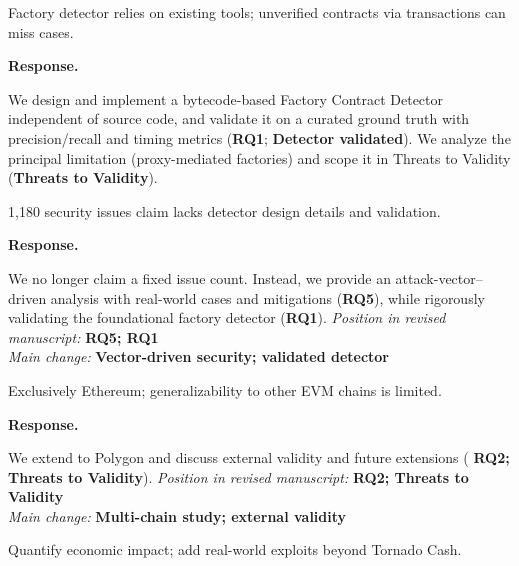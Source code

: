 \documentclass[acmsmall]{acmart}
\begin{document}
	\begin{tcolorbox}
		[commentbox,title=Reviewer \#3 -- Comment 3] Factory detector relies on existing tools;
		unverified contracts via transactions can miss cases.
	\end{tcolorbox}

	\noindent
	\textbf{Response.}

	We design and implement a bytecode-based Factory Contract Detector independent of source code, and
	validate it on a curated ground truth with precision/recall and timing metrics ({\textbf{RQ1}}; {\textbf{Detector validated}}).
	We analyze the principal limitation (proxy-mediated factories) and scope it in Threats to Validity
	({\textbf{Threats to Validity}}).

	\begin{tcolorbox}
		[commentbox,title=Reviewer \#3 -- Comment 4] 1,180 security issues claim lacks detector design
		details and validation.
	\end{tcolorbox}

	\noindent
	\textbf{Response.}

	We no longer claim a fixed issue count. Instead, we provide an attack-vector–driven analysis
	with real-world cases and mitigations ({\textbf{RQ5}}), while rigorously validating the foundational
	factory detector ({\textbf{RQ1}}). \textit{Position in revised manuscript:} {\color{red}\textbf{RQ5; RQ1}}\\
	\textit{Main change:} {\color{blue}\textbf{Vector-driven security; validated detector}}

	\begin{tcolorbox}
		[commentbox,title=Reviewer \#3 -- Comment 5] Exclusively Ethereum; generalizability to other
		EVM chains is limited.
	\end{tcolorbox}

	\noindent
	\textbf{Response.}

	We extend to Polygon and discuss external validity and future extensions ( {\textbf{RQ2; Threats to Validity}}).
	\textit{Position in revised manuscript:} {\color{red}\textbf{RQ2; Threats to Validity}}\\ \textit{Main
	change:} {\color{blue}\textbf{Multi-chain study; external validity}}

	\begin{tcolorbox}
		[commentbox,title=Reviewer \#3 -- Comment 6] Quantify economic impact; add real-world
		exploits beyond Tornado Cash.
	\end{tcolorbox}
\end{document}
